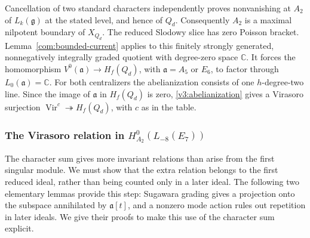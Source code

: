 \documentclass[11pt,a4paper]{amsart}
\numberwithin{equation}{section}
\theoremstyle{definition}
\theoremstyle{remark}
\newcommand{\C}{\mathbb C}
\newcommand{\g}{\mathfrak g}
\newcommand{\Vir}{\operatorname{Vir}}
\begin{document}
Cancellation of two standard characters independently proves nonvanishing at $A_2$
of $L_k(\g)$ at the stated level, and hence of $Q_d$. Consequently $A_2$
is a maximal nilpotent boundary of $X_{Q_d}$. The reduced Slodowy slice
has zero Poisson bracket. Lemma~\ref{com:bounded-current} applies to this
finitely strongly generated, nonnegatively integrally graded quotient
with degree-zero space $\C$. It forces the homomorphism $V^0(\mathfrak a)\to H_f(Q_d)$, with
$\mathfrak a=A_5$ or $E_6$, to factor through $L_0(\mathfrak a)=\C$.
For both centralizers the abelianization consists of one
$h$-degree-two line. Since the image of $\mathfrak a$ in $H_f(Q_d)$ is zero, \cref{v3:abelianization} gives a Virasoro surjection
$\Vir^c\twoheadrightarrow H_f(Q_d)$, with $c$ as in the table.

\subsubsection{\texorpdfstring{The Virasoro relation in $H^0_{A_2}(L_{-8}(E_7))$}{The Virasoro relation in the A2 reduction of L-8(E7)}}
The character sum gives more invariant relations than arise from the first singular
module. We must show that the extra relation belongs to the first
reduced ideal, rather than being counted only in a later ideal. The following
two elementary lemmas provide this step: Sugawara grading gives a projection
onto the subspace annihilated by $\mathfrak a[t]$, and a nonzero mode action
rules out repetition in later ideals. We give their proofs to make this
use of the character sum explicit.
\end{document}
